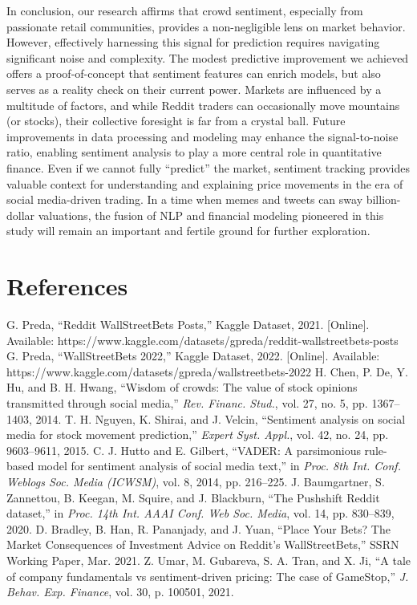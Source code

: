 \documentclass[conference]{IEEEtran}
\begin{document}
In conclusion, our research affirms that crowd sentiment, especially from passionate retail communities, provides a non-negligible lens on market behavior. However, effectively harnessing this signal for prediction requires navigating significant noise and complexity. The modest predictive improvement we achieved offers a proof-of-concept that sentiment features can enrich models, but also serves as a reality check on their current power. Markets are influenced by a multitude of factors, and while Reddit traders can occasionally move mountains (or stocks), their collective foresight is far from a crystal ball. Future improvements in data processing and modeling may enhance the signal-to-noise ratio, enabling sentiment analysis to play a more central role in quantitative finance. Even if we cannot fully “predict” the market, sentiment tracking provides valuable context for understanding and explaining price movements in the era of social media-driven trading. In a time when memes and tweets can sway billion-dollar valuations, the fusion of NLP and financial modeling pioneered in this study will remain an important and fertile ground for further exploration.

\section*{References}
\begin{thebibliography}{99}
	 G. Preda, ``Reddit WallStreetBets Posts,'' Kaggle Dataset, 2021. [Online]. Available: https://www.kaggle.com/datasets/gpreda/reddit-wallstreetbets-posts
	 G. Preda, ``WallStreetBets 2022,'' Kaggle Dataset, 2022. [Online]. Available: https://www.kaggle.com/datasets/gpreda/wallstreetbets-2022
	 H. Chen, P. De, Y. Hu, and B. H. Hwang, ``Wisdom of crowds: The value of stock opinions transmitted through social media,'' \emph{Rev. Financ. Stud.}, vol. 27, no. 5, pp. 1367--1403, 2014.
	 T. H. Nguyen, K. Shirai, and J. Velcin, ``Sentiment analysis on social media for stock movement prediction,'' \emph{Expert Syst. Appl.}, vol. 42, no. 24, pp. 9603--9611, 2015.
	 C. J. Hutto and E. Gilbert, ``VADER: A parsimonious rule-based model for sentiment analysis of social media text,'' in \emph{Proc. 8th Int. Conf. Weblogs Soc. Media (ICWSM)}, vol. 8, 2014, pp. 216--225.
	 J. Baumgartner, S. Zannettou, B. Keegan, M. Squire, and J. Blackburn, ``The Pushshift Reddit dataset,'' in \emph{Proc. 14th Int. AAAI Conf. Web Soc. Media}, vol. 14, pp. 830--839, 2020.
	 D. Bradley, B. Han, R. Pananjady, and J. Yuan, ``Place Your Bets? The Market Consequences of Investment Advice on Reddit’s WallStreetBets,'' SSRN Working Paper, Mar. 2021.
	 Z. Umar, M. Gubareva, S. A. Tran, and X. Ji, ``A tale of company fundamentals vs sentiment-driven pricing: The case of GameStop,'' \emph{J. Behav. Exp. Finance}, vol. 30, p. 100501, 2021.
\end{thebibliography}
\end{document}
